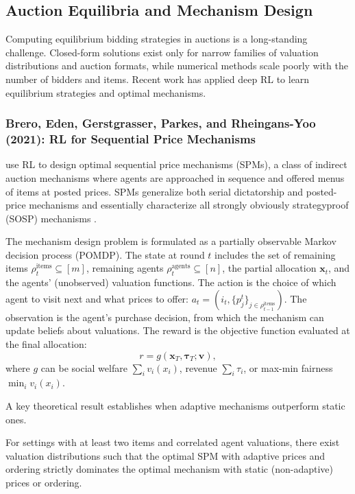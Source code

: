 \subsection{Auction Equilibria and Mechanism Design}

Computing equilibrium bidding strategies in auctions is a long-standing challenge. Closed-form solutions exist only for narrow families of valuation distributions and auction formats, while numerical methods scale poorly with the number of bidders and items. Recent work has applied deep RL to learn equilibrium strategies and optimal mechanisms.


\subsubsection{Brero, Eden, Gerstgrasser, Parkes, and Rheingans-Yoo (2021): RL for Sequential Price Mechanisms}

\citet{BreroEtAl2021} use RL to design optimal sequential price mechanisms (SPMs), a class of indirect auction mechanisms where agents are approached in sequence and offered menus of items at posted prices. SPMs generalize both serial dictatorship and posted-price mechanisms and essentially characterize all strongly obviously strategyproof (SOSP) mechanisms \citep{PyciaAndTroyan2019}.

The mechanism design problem is formulated as a partially observable Markov decision process (POMDP). The state at round $t$ includes the set of remaining items $\rho_t^{\text{items}} \subseteq [m]$, remaining agents $\rho_t^{\text{agents}} \subseteq [n]$, the partial allocation $\mathbf{x}_t$, and the agents' (unobserved) valuation functions. The action is the choice of which agent to visit next and what prices to offer: $a_t = (i_t, \{p_j^t\}_{j \in \rho_{t-1}^{\text{items}}})$. The observation is the agent's purchase decision, from which the mechanism can update beliefs about valuations. The reward is the objective function evaluated at the final allocation:
\begin{equation}
r = g(\mathbf{x}_T, \boldsymbol{\tau}_T; \mathbf{v}), \label{eq:brero_reward}
\end{equation}
where $g$ can be social welfare $\sum_{i} v_i(x_i)$, revenue $\sum_i \tau_i$, or max-min fairness $\min_i v_i(x_i)$.

A key theoretical result establishes when adaptive mechanisms outperform static ones.

\begin{theorem}
For settings with at least two items and correlated agent valuations, there exist valuation distributions such that the optimal SPM with adaptive prices and ordering strictly dominates the optimal mechanism with static (non-adaptive) prices or ordering.
\end{theorem}

